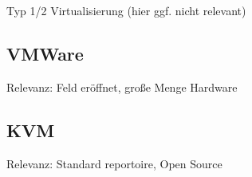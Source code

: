 		Typ 1/2 Virtualisierung (hier ggf. nicht relevant)


		\subsection{VMWare}

		Relevanz: Feld eröffnet, große Menge Hardware

		\subsection{KVM}

		Relevanz: Standard reportoire, Open Source

		